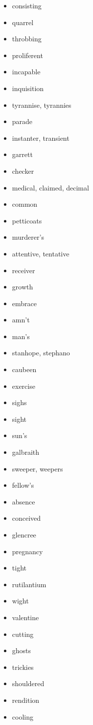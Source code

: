 \documentclass{article}
\begin{document}
\begin{itemize}
    \item consisting
    \item quarrel
    \item throbbing
    \item proliferent
    \item incapable
    \item inquisition
    \item tyrannise, tyrannies
    \item parade
    \item instanter, transient
    \item garrett
    \item checker
    \item medical, claimed, decimal
    \item common
    \item petticoats
    \item murderer's
    \item attentive, tentative
    \item receiver
    \item growth
    \item embrace
    \item amn't
    \item man's
    \item stanhope, stephano
    \item caubeen
    \item exercise
    \item sighs
    \item sight
    \item sun's
    \item galbraith
    \item sweeper, weepers
    \item fellow's
    \item absence
    \item conceived
    \item glencree
    \item pregnancy
    \item tight
    \item rutilantium
    \item wight
    \item valentine
    \item cutting
    \item ghosts
    \item trickies
    \item shouldered
    \item rendition
    \item cooling

\end{itemize}
\end{document}
